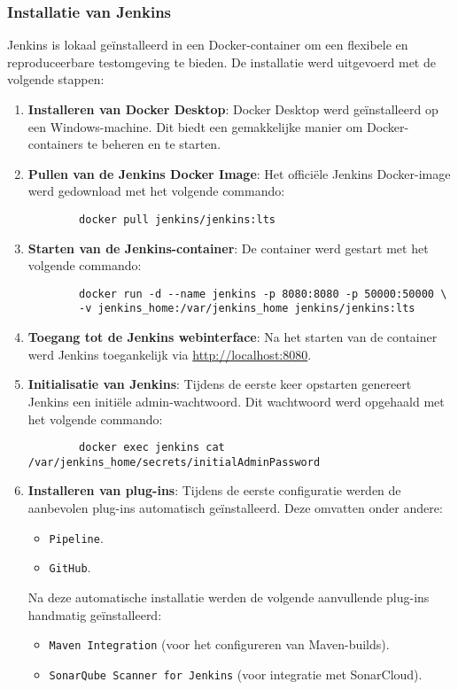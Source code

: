 \subsubsection{Installatie van Jenkins}

Jenkins is lokaal geïnstalleerd in een Docker-container om een flexibele en reproduceerbare testomgeving te bieden. De installatie werd uitgevoerd met de volgende stappen:

\begin{enumerate}
    \item \textbf{Installeren van Docker Desktop}:
    Docker Desktop werd geïnstalleerd op een Windows-machine. Dit biedt een gemakkelijke manier om Docker-containers te beheren en te starten.
    \item \textbf{Pullen van de Jenkins Docker Image}:
    Het officiële Jenkins Docker-image werd gedownload met het volgende commando:
    \begin{verbatim}
        docker pull jenkins/jenkins:lts
    \end{verbatim}
    \item \textbf{Starten van de Jenkins-container}:
    De container werd gestart met het volgende commando:
    \begin{verbatim}
        docker run -d --name jenkins -p 8080:8080 -p 50000:50000 \
        -v jenkins_home:/var/jenkins_home jenkins/jenkins:lts
    \end{verbatim}
    \item \textbf{Toegang tot de Jenkins webinterface}:
    Na het starten van de container werd Jenkins toegankelijk via \url{http://localhost:8080}.
    \item \textbf{Initialisatie van Jenkins}:
    Tijdens de eerste keer opstarten genereert Jenkins een initiële admin-wachtwoord. Dit wachtwoord werd opgehaald met het volgende commando:
    \begin{verbatim}
        docker exec jenkins cat /var/jenkins_home/secrets/initialAdminPassword
    \end{verbatim}
    \item \textbf{Installeren van plug-ins}:
    Tijdens de eerste configuratie werden de aanbevolen plug-ins automatisch geïnstalleerd. Deze omvatten onder andere:
    \begin{itemize}
        \item \texttt{Pipeline}.
        \item \texttt{GitHub}.
    \end{itemize}
    Na deze automatische installatie werden de volgende aanvullende plug-ins handmatig geïnstalleerd:
    \begin{itemize}
        \item \texttt{Maven Integration} (voor het configureren van Maven-builds).
        \item \texttt{SonarQube Scanner for Jenkins} (voor integratie met SonarCloud).
    \end{itemize}
\end{enumerate}

